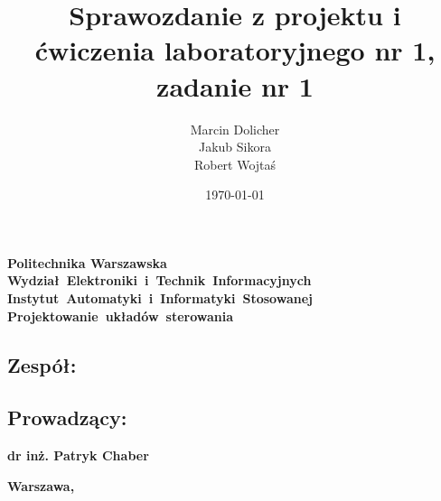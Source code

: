 \documentclass{mwrep}
\title{\bf Sprawozdanie z projektu i ćwiczenia laboratoryjnego nr 1, zadanie nr 1 \vskip 0.1cm}
\author{Marcin Dolicher \\ Jakub Sikora \\ Robert Wojtaś}
\date{\today}
\begin{document}
\frenchspacing
\pagestyle{uheadings}

\makeatletter
\renewcommand{\maketitle}{\begin{titlepage}
		\begin{center}{
				\LARGE {\bf Politechnika Warszawska}}\\
            \vspace{0.4cm}
            \leftskip-0.9cm
            {\LARGE {\bf \mbox{Wydział Elektroniki i Technik Informacyjnych}}}\\
            \vspace{0.2cm}
            {\LARGE {\bf \mbox{Instytut Automatyki i Informatyki Stosowanej}}}\\
            
            \vspace{5cm}
            \leftskip-1.3cm
			{\bf \Huge \mbox{Projektowanie układów sterowania} \vskip 0.1cm}
		\end{center}
		\vspace{0.1cm}

		\begin{center}
			{\bf \LARGE \@title}
		\end{center}

		\vspace{9cm}
		\begin{paracol}{2}
			\addtocontents{toc}{\protect\setcounter{tocdepth}{1}}
			\subsection*{Zespół:}
			\bf{ \Large{ \noindent\@author \par}}
			\addtocontents{toc}{\protect\setcounter{tocdepth}{2}}

			\switchcolumn \addtocontents{toc}{\protect\setcounter{tocdepth}{1}}
			\subsection*{Prowadzący:}
			\bf{\Large{\noindent dr inż. Patryk Chaber}}
			\addtocontents{toc}{\protect\setcounter{tocdepth}{2}}

		\end{paracol}
		\vspace*{\stretch{6}}
		\begin{center}
			\bf{\large{Warszawa, \@date\vskip 0.1cm}}
		\end{center}
	\end{titlepage}
}
\makeatother
\maketitle
\tableofcontents




\end{document}
